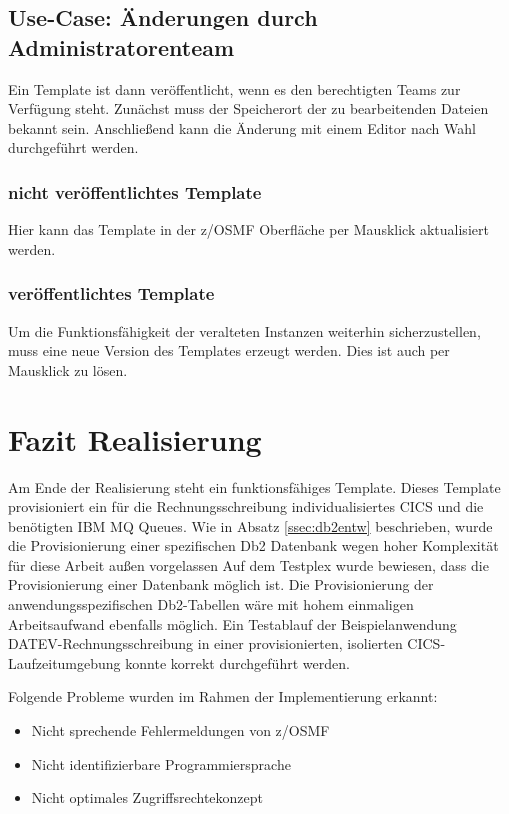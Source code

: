 \subsection{Use-Case: Änderungen durch Administratorenteam}
Ein Template ist dann veröffentlicht, wenn es den berechtigten Teams zur Verfügung steht.
Zunächst muss der Speicherort der zu bearbeitenden Dateien bekannt sein.
Anschließend kann die Änderung mit einem Editor nach Wahl durchgeführt werden.

\subsubsection{nicht veröffentlichtes Template}
Hier kann das Template in der z/OSMF Oberfläche per Mausklick aktualisiert werden.

\subsubsection{veröffentlichtes Template}
Um die Funktionsfähigkeit der veralteten Instanzen weiterhin sicherzustellen, muss eine neue Version des Templates erzeugt werden.
Dies ist auch per Mausklick zu lösen.

\section{Fazit Realisierung}
Am Ende der Realisierung steht ein funktionsfähiges Template.
Dieses Template provisioniert ein für die Rechnungsschreibung individualisiertes CICS und die benötigten IBM MQ Queues. 
Wie in Absatz \ref{ssec:db2entw} beschrieben, wurde die Provisionierung einer spezifischen Db2 Datenbank wegen hoher Komplexität für diese Arbeit außen vorgelassen
Auf dem Testplex wurde bewiesen, dass die Provisionierung einer Datenbank möglich ist.
Die Provisionierung der anwendungsspezifischen Db2-Tabellen wäre mit hohem einmaligen Arbeitsaufwand ebenfalls möglich.
Ein Testablauf der Beispielanwendung DATEV-Rechnungsschreibung in einer provisionierten, isolierten CICS-Laufzeitumgebung konnte korrekt durchgeführt werden.

Folgende Probleme wurden im Rahmen der Implementierung erkannt:

\begin{samepage}
\begin{itemize}
\item Nicht sprechende Fehlermeldungen von z/OSMF
\item Nicht identifizierbare Programmiersprache
\item Nicht optimales Zugriffsrechtekonzept
\end{itemize}
\end{samepage}

